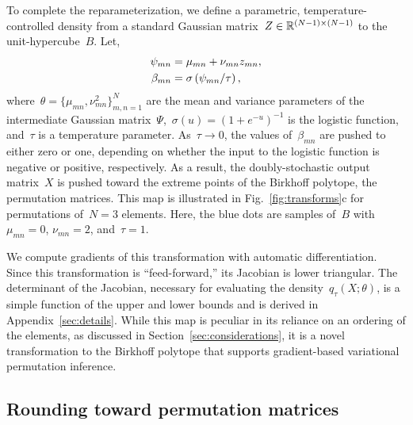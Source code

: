 \documentclass[twoside]{article}
\begin{document}
To complete the reparameterization, we define a parametric,
temperature-controlled density from a standard Gaussian matrix~${Z \in \mathbb{R}^{(N-1) \times (N-1)}}$
to the unit-hypercube~$B$.
Let,
\begin{align*}
  \psi_{mn} &= \mu_{mn} + \nu_{mn} z_{mn}, \\
   \beta_{mn} &= \sigma\left( \psi_{mn} / \tau \right),
\end{align*}
where~${\theta = \{\mu_{mn}, \nu^2_{mn}\}_{m,n=1}^N}$ are the mean and
variance parameters of the intermediate Gaussian
matrix~$\Psi$,~${\sigma(u) = (1+e^{-u})^{-1}}$ is the logistic
function, and~$\tau$ is a temperature parameter. As~$\tau \to 0$, the
values of~$\beta_{mn}$ are pushed to either zero or one, depending on
whether the input to the logistic function is negative or positive,
respectively.  As a result, the doubly-stochastic output matrix~$X$ is
pushed toward the extreme points of the Birkhoff polytope, the
permutation matrices.  This map is illustrated in
Fig.~\ref{fig:transforms}c for permutations of~${N=3}$ elements.
Here, the blue dots are samples of~$B$ with~$\mu_{mn}=0$,
$\nu_{mn}=2$, and~$\tau=1$.

We compute gradients of this transformation with automatic
differentiation.  Since this transformation is ``feed-forward,'' its
Jacobian is lower triangular. The determinant of the Jacobian,
necessary for evaluating the density~$q_\tau(X; \theta)$, is a simple
function of the upper and lower bounds and is derived in
Appendix~\ref{sec:details}.  While this map is peculiar in its
reliance on an ordering of the elements, as discussed in
Section~\ref{sec:considerations}, it is a novel transformation to the
Birkhoff polytope that supports gradient-based variational
permutation inference.

\subsection{Rounding toward permutation matrices}
\label{sub:rounding}
\end{document}
